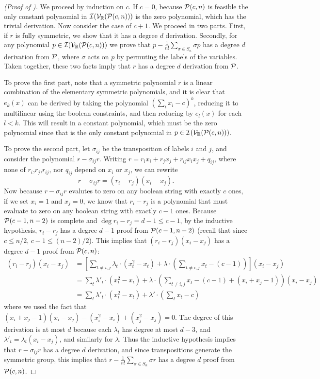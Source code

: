 \begin{proof}[(Proof of )]
We proceed by induction on $c$. If $c = 0$, because $\mathcal P(c,n)$ is feasible the only constant polynomial in $\mathcal I(\mathcal V_\mathbb R(\mathcal P(c,n)))$ is the zero polynomial, which has the trivial derivation. Now consider the case of $c+1$. We proceed in two parts. First, if $r$ is fully symmetric, we show that it has a degree $d$ derivation. Secondly, for any polynomial $p \in \mathcal I(\mathcal V_\mathbb R(\mathcal P(c,n)))$ we prove that $p - \frac{1}{n!}\sum_{\sigma \in S_n} \sigma p$ has a degree $d$ derivation from $\mathcal P$, where $\sigma$ acts on $p$ by permuting the labels of the variables. Taken together, these two facts imply that $r$ has a degree $d$ derivation from $\mathcal P$.

To prove the first part, note that a symmetric polynomial $r$ is a linear combination of the elementary symmetric polynomials, and it is clear that $e_k(x)$ can be derived by taking the polynomial $(\sum_i x_i - c)^k$, reducing it to multilinear using the boolean constraints, and then reducing by $e_l(x)$ for each $l < k$. This will result in a constant polynomial, which must be the zero polynomial since that is the only constant polynomial in $p \in \mathcal I(\mathcal V_\mathbb R(\mathcal P(c,n)))$. 

To prove the second part, let $\sigma_{ij}$ be the transposition of labels $i$ and $j$, and consider the polynomial $r - \sigma_{ij}r$. Writing $r = r_ix_i + r_jx_j + r_{ij}x_ix_j + q_{ij}$, where none of $r_i$,$r_j$,$r_{ij}$, nor $q_{ij}$ depend on $x_i$ or $x_j$, we can rewrite
\[r - \sigma_{ij}r = (r_i - r_j)(x_i - x_j).\]
Now because $r - \sigma_{ij}r$ evalutes to zero on any boolean string with exactly $c$ ones, if we set $x_i = 1$ and $x_j = 0$, we know that $r_i - r_j$ is a polynomial that must evaluate to zero on any boolean string with exactly $c-1$ ones. Because $\mathcal P(c-1,n-2)$ is complete and $\deg r_i - r_j = d-1 \leq c-1$, by the inductive hypothesis, $r_i - r_j$ has a degree $d-1$ proof from $\mathcal P(c-1,n-2)$ (recall that since $c \leq n/2$, $c-1 \leq (n-2)/2$). This implies that $(r_i - r_j)(x_i - x_j)$ has a degree $d-1$ proof from $\mathcal P(c,n)$:
\begin{align*}
(r_i - r_j)(x_i - x_j) &= \left[\sum_{t \neq i,j} \lambda_t\cdot (x_t^2 - x_t) + \lambda \cdot \left(\sum_{t \neq i,j} x_t - (c-1)\right)\right](x_i - x_j) \\
&= \sum_{t} \lambda'_t \cdot (x_t^2 - x_t) + \lambda \cdot \left(\sum_{t \neq i,j} x_t - (c-1) + (x_i + x_j - 1)\right)(x_i - x_j)\\
&= \sum_t \lambda'_t \cdot (x_t^2 - x_t) +\lambda' \cdot \left(\sum_t x_t - c\right)
\end{align*}
where we used the fact that $(x_i + x_j - 1)(x_i - x_j) - (x_i^2 - x_i) + (x_j^2 - x_j) = 0$. The degree of this derivation is at most $d$ because each $\lambda_t$ has degree at most $d-3$, and $\lambda'_t = \lambda_t(x_i - x_j)$, and similarly for $\lambda$. Thus the inductive hypothesis implies that $r - \sigma_{ij}r$ has a degree $d$ derivation, and since transpositions generate the symmetric group, this implies that $r - \frac{1}{n!}\sum_{\sigma \in S_n} \sigma r$ has a degree $d$ proof from $\mathcal P(c,n)$.
\end{proof}

